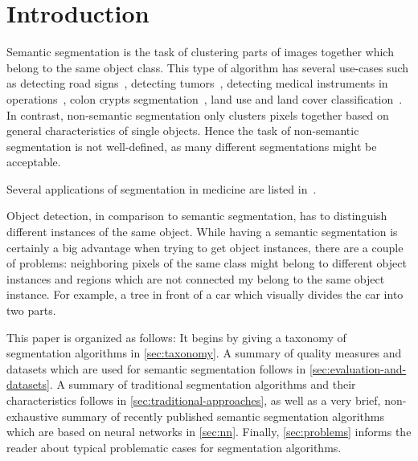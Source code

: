 
\section{Introduction}\label{sec:introduction}
Semantic segmentation is the task of clustering parts of images together which
belong to the same object class. This type of algorithm has several use-cases
such as detecting road signs~\cite{4220659}, detecting
tumors~\cite{moon2002automatic}, detecting medical instruments in
operations~\cite{wei1997automatic}, colon crypts
segmentation~\cite{cohen2015memory}, land use and land cover
classification~\cite{huang2002assessment}. In contrast, non-semantic
segmentation only clusters pixels together based on general characteristics of
single objects. Hence the task of non-semantic segmentation is not
well-defined, as many different segmentations might be acceptable.

Several applications of segmentation in medicine are listed
in~\cite{annurev.bioeng.2.1.315}.

Object detection, in comparison to semantic segmentation, has to distinguish
different instances of the same object. While having a semantic segmentation is
certainly a big advantage when trying to get object instances, there are a
couple of problems: neighboring pixels of the same class might belong to
different object instances and regions which are not connected my belong to the
same object instance. For example, a tree in front of a car which visually
divides the car into two parts.

This paper is organized as follows: It begins by giving a taxonomy of
segmentation algorithms in \cref{sec:taxonomy}. A summary of quality measures
and datasets which are used for semantic segmentation follows in
\cref{sec:evaluation-and-datasets}. A summary of traditional
segmentation algorithms and their characteristics follows in
\cref{sec:traditional-approaches}, as well as a very brief, non-exhaustive
summary of recently published semantic segmentation algorithms which are based
on neural networks in \cref{sec:nn}. Finally, \cref{sec:problems} informs the
reader about typical problematic cases for segmentation algorithms.
